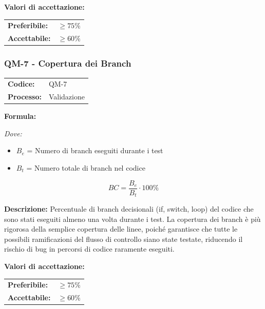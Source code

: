 \documentclass[a4paper,11pt,oneside]{scrartcl}
\begin{document}
\vspace{0.2cm}
\noindent\textbf{Valori di accettazione:}
\vspace{0.1cm}

\noindent
\begin{tabular}{@{}ll@{}}
\textbf{Preferibile:} & $\ge 75\%$ \\
\textbf{Accettabile:} & $\ge 60\%$ \\
\end{tabular}

\subsubsection{QM-7 - Copertura dei Branch}

\noindent
\begin{tabular}{@{}p{}p{}@{}}
\textbf{Codice:} & QM-7 \\
\textbf{Processo:} & Validazione \\
\end{tabular}

\vspace{0.3cm}
\noindent\textbf{Formula:}

\noindent\textit{Dove:}
\begin{itemize}[leftmargin=1.5cm, topsep=0pt, itemsep=0pt]
    \item $B_e$ = Numero di branch eseguiti durante i test
    \item $B_t$ = Numero totale di branch nel codice
\end{itemize}

\[
BC = \frac{B_e}{B_t} \cdot 100\%
\]

\noindent\textbf{Descrizione:} Percentuale di branch decisionali (if, switch, loop) del codice che sono stati eseguiti almeno una volta durante i test. La copertura dei branch è più rigorosa della semplice copertura delle linee, poiché garantisce che tutte le possibili ramificazioni del flusso di controllo siano state testate, riducendo il rischio di bug in percorsi di codice raramente eseguiti.

\vspace{0.2cm}
\noindent\textbf{Valori di accettazione:}
\vspace{0.1cm}

\noindent
\begin{tabular}{@{}ll@{}}
\textbf{Preferibile:} & $\ge 75\%$ \\
\textbf{Accettabile:} & $\ge 60\%$ \\
\end{tabular}
\end{document}
